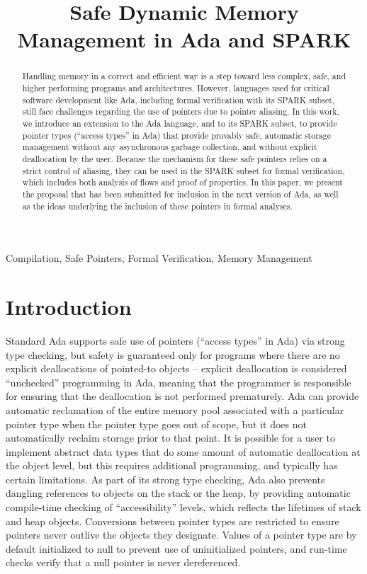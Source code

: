 \documentclass{llncs}
\begin{document}
\title{Safe Dynamic Memory Management in Ada and SPARK}

\maketitle
\begin{abstract}
Handling memory in a correct and efficient way is a step toward less complex, safe, and higher performing programs and architectures. However, languages used for critical software development like Ada, including formal verification with its SPARK subset, still face challenges regarding the use of pointers due to pointer aliasing. In this work, we introduce an extension to the Ada language, and to its SPARK subset, to provide pointer types (``access types'' in Ada) that provide provably safe, automatic storage management without any asynchronous garbage collection, and without explicit deallocation by the user. Because the mechanism for these safe pointers relies on a strict control of aliasing, they can be used in the SPARK subset for formal verification, which includes both analysis of flows and proof of properties. In this paper, we present the proposal that has been submitted for inclusion in the next version of Ada, as well as the ideas underlying the inclusion of these pointers in formal analyses.
\end{abstract}



\keywords 

Compilation, Safe Pointers, Formal Verification, Memory Management


\section{Introduction}

Standard Ada supports safe use of pointers (``access types'' in Ada) via strong type checking, but safety is guaranteed only for programs where there are no explicit deallocations of pointed-to objects -- explicit deallocation is considered ``unchecked'' programming in Ada, meaning that the programmer is responsible for ensuring that the deallocation is not performed prematurely. Ada can provide automatic reclamation of the entire memory pool associated with a particular pointer type when the pointer type goes out of scope, but it does not automatically reclaim storage prior to that point. It is possible for a user to implement abstract data types that do some amount of automatic deallocation at the object level, but this requires additional programming, and typically has certain limitations. As part of its strong type checking, Ada also prevents dangling references to objects on the stack or the heap, by providing automatic compile-time checking of ``accessibility'' levels, which reflects the lifetimes of stack and heap objects.  Conversions between pointer types are restricted to ensure pointers never outlive the objects they designate. Values of a pointer type are by default initialized to null to prevent use of uninitialized pointers, and run-time checks verify that a null pointer is never dereferenced.
\end{document}
